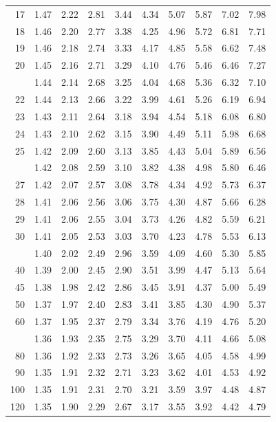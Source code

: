 \documentclass[10pt]{article}
\begin{document}
\begin{longtable}{@{}r!{\vrule width 0.8pt\hspace{0.55em}}rrrrrrrrr@{}}
17 & 1.47 & 2.22 & 2.81 & 3.44 & 4.34 & 5.07 & 5.87 & 7.02 & 7.98 \\
18 & 1.46 & 2.20 & 2.77 & 3.38 & 4.25 & 4.96 & 5.72 & 6.81 & 7.71 \\
19 & 1.46 & 2.18 & 2.74 & 3.33 & 4.17 & 4.85 & 5.58 & 6.62 & 7.48 \\
20 & 1.45 & 2.16 & 2.71 & 3.29 & 4.10 & 4.76 & 5.46 & 6.46 & 7.27 \\
 & 1.44 & 2.14 & 2.68 & 3.25 & 4.04 & 4.68 & 5.36 & 6.32 & 7.10 \\
22 & 1.44 & 2.13 & 2.66 & 3.22 & 3.99 & 4.61 & 5.26 & 6.19 & 6.94 \\
23 & 1.43 & 2.11 & 2.64 & 3.18 & 3.94 & 4.54 & 5.18 & 6.08 & 6.80 \\
24 & 1.43 & 2.10 & 2.62 & 3.15 & 3.90 & 4.49 & 5.11 & 5.98 & 6.68 \\
25 & 1.42 & 2.09 & 2.60 & 3.13 & 3.85 & 4.43 & 5.04 & 5.89 & 6.56 \\
 & 1.42 & 2.08 & 2.59 & 3.10 & 3.82 & 4.38 & 4.98 & 5.80 & 6.46 \\
27 & 1.42 & 2.07 & 2.57 & 3.08 & 3.78 & 4.34 & 4.92 & 5.73 & 6.37 \\
28 & 1.41 & 2.06 & 2.56 & 3.06 & 3.75 & 4.30 & 4.87 & 5.66 & 6.28 \\
29 & 1.41 & 2.06 & 2.55 & 3.04 & 3.73 & 4.26 & 4.82 & 5.59 & 6.21 \\
30 & 1.41 & 2.05 & 2.53 & 3.03 & 3.70 & 4.23 & 4.78 & 5.53 & 6.13 \\
 & 1.40 & 2.02 & 2.49 & 2.96 & 3.59 & 4.09 & 4.60 & 5.30 & 5.85 \\
40 & 1.39 & 2.00 & 2.45 & 2.90 & 3.51 & 3.99 & 4.47 & 5.13 & 5.64 \\
45 & 1.38 & 1.98 & 2.42 & 2.86 & 3.45 & 3.91 & 4.37 & 5.00 & 5.49 \\
50 & 1.37 & 1.97 & 2.40 & 2.83 & 3.41 & 3.85 & 4.30 & 4.90 & 5.37 \\
60 & 1.37 & 1.95 & 2.37 & 2.79 & 3.34 & 3.76 & 4.19 & 4.76 & 5.20 \\
 & 1.36 & 1.93 & 2.35 & 2.75 & 3.29 & 3.70 & 4.11 & 4.66 & 5.08 \\
80 & 1.36 & 1.92 & 2.33 & 2.73 & 3.26 & 3.65 & 4.05 & 4.58 & 4.99 \\
90 & 1.35 & 1.91 & 2.32 & 2.71 & 3.23 & 3.62 & 4.01 & 4.53 & 4.92 \\
100 & 1.35 & 1.91 & 2.31 & 2.70 & 3.21 & 3.59 & 3.97 & 4.48 & 4.87 \\
120 & 1.35 & 1.90 & 2.29 & 2.67 & 3.17 & 3.55 & 3.92 & 4.42 & 4.79 \\

\end{longtable}
\end{document}
